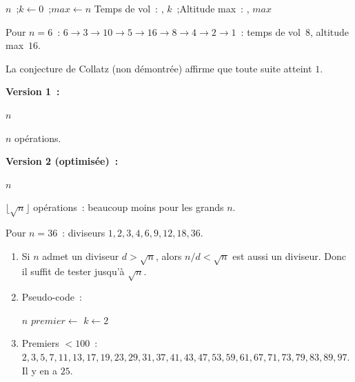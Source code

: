 
\begin{algorithm}[H]
\caption{Suite de Syracuse}
\Lire $n$~;\quad $k \leftarrow 0$~;\quad $\mathit{max} \leftarrow n$\;
\Afficher \og Temps de vol~: \fg, $k$~;\quad \Afficher \og Altitude max~: \fg, $\mathit{max}$\;
\end{algorithm}

Pour $n=6$~: $6\to3\to10\to5\to16\to8\to4\to2\to1$~: temps de vol~$8$, altitude max~$16$.

La conjecture de Collatz (non d\'emontr\'ee) affirme que toute suite atteint $1$.


\textbf{Version 1~:}
\begin{algorithm}[H]
\caption{Diviseurs (version na\"ive)}
\Lire $n$\;
\end{algorithm}
$n$ op\'erations.

\textbf{Version 2 (optimis\'ee)~:}
\begin{algorithm}[H]
\caption{Diviseurs (version optimis\'ee)}
\Lire $n$\;
\end{algorithm}
$\lfloor\sqrt{n}\rfloor$ op\'erations~: beaucoup moins pour les grands $n$.

Pour $n=36$~: diviseurs $1,2,3,4,6,9,12,18,36$.


\begin{enumerate}
  \item Si $n$ admet un diviseur $d > \sqrt{n}$, alors $n/d < \sqrt{n}$
        est aussi un diviseur. Donc il suffit de tester jusqu'\`a $\sqrt{n}$.
  \item Pseudo-code~:
\begin{algorithm}[H]
\caption{Test de primalit\'e}
\Lire $n$\;
$\mathit{premier} \leftarrow$ \Vrai\;
$k \leftarrow 2$\;
\end{algorithm}
  \item Premiers $< 100$~: $2,3,5,7,11,13,17,19,23,29,31,37,41,43,47,53,59,61,67,71,73,79,83,89,97$.
        Il y en a $25$.
\end{enumerate}

